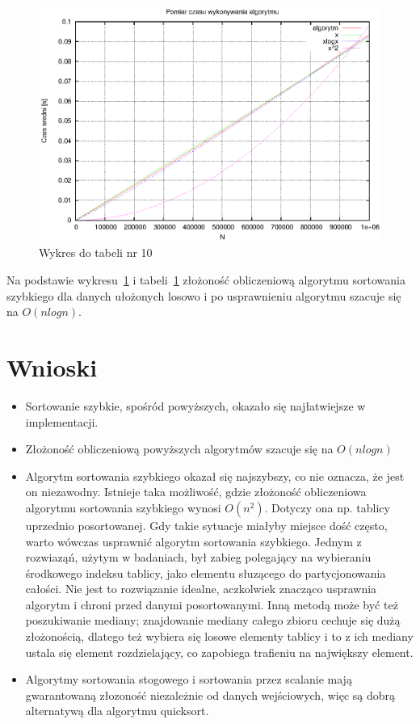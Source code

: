 \documentclass[a4paper,11pt]{article}
\begin{document}
\begin{enumerate}
\begin{table}[th]
\begin{tabular}{|l|l|l|}
\hline
    \end{tabular}
    \label{tab10}
    \end{table}
    \newpage
 \begin{figure}[!h]
\centering
\includegraphics[width=1\textwidth]{../prj/wykres73.eps}
\caption{Wykres do tabeli nr 10}
\label{Wykres10}
\end{figure} 
Na podstawie wykresu~\ref{Wykres10} i tabeli~\ref{tab10} złożoność obliczeniową algorytmu sortowania szybkiego dla danych ułożonych losowo i po usprawnieniu algorytmu szacuje się na $ O(nlogn) $.
\newpage
\section{Wnioski}
\begin{itemize}
 \item Sortowanie szybkie, spośród powyższych, okazało się najłatwiejsze w implementacji.
 \item Złożoność obliczeniową powyższych algorytmów szacuje się na $ O(n logn) $
 \item Algorytm sortowania szybkiego okazał się najszybszy, co nie oznacza, że jest on niezawodny. Istnieje taka możliwość, gdzie złożoność obliczeniowa 
 algorytmu sortowania szybkiego wynosi $ O(n^{2}) $. Dotyczy ona np. tablicy uprzednio posortowanej. Gdy takie sytuacje miałyby miejsce dość często, warto wówczas usprawnić algorytm sortowania szybkiego. Jednym z rozwiaząń, użytym w badaniach, był zabieg 
 polegający na wybieraniu środkowego indeksu tablicy, jako elementu słuzącego do partycjonowania całości. Nie jest to rozwiązanie idealne, aczkolwiek znacząco usprawnia algorytm i chroni przed 
 danymi posortowanymi. Inną metodą może być też poszukiwanie mediany; znajdowanie mediany całego zbioru cechuje się dużą złożonością, dlatego też 
 wybiera się losowe elementy tablicy i to z ich mediany ustala się element rozdzielający, co zapobiega trafieniu na największy element.
 \item Algorytmy sortowania stogowego i sortowania przez scalanie mają gwarantowaną złozoność niezależnie od danych wejściowych, więc
 są dobrą alternatywą dla algorytmu quicksort.
\end{itemize}


\end{enumerate}
\end{document}
